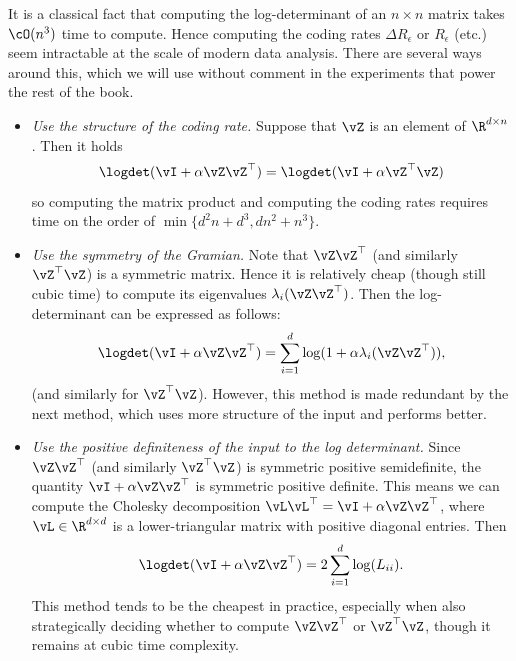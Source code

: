 \documentclass[../../book-main.tex]{subfiles}
\begin{document}
\begin{remark}
    It is a classical fact that computing the log-determinant of an
    \(n \times n\) matrix takes \(\cO(n^{3})\) time to compute. Hence
    computing the coding rates \(\Delta R_{\epsilon}\) or
    \(R_{\epsilon}\) (etc.) seem intractable at the scale of modern
    data analysis. There are several ways around this, which we will
    use without comment in the experiments that power the rest of the book.
    \begin{itemize}
        \item \textit{Use the structure of the coding rate.} Suppose
            that \(\vZ\) is an element of \(\R^{d \times n}\). Then it holds
            \begin{equation}
                \logdet(\vI + \alpha \vZ\vZ^{\top}) = \logdet(\vI +
                \alpha \vZ^{\top}\vZ)
            \end{equation}
            so computing the matrix product and computing the coding
            rates requires time on the order of \(\min\{d^{2}n +
            d^{3}, dn^{2} + n^{3}\}\).
        \item \textit{Use the symmetry of the Gramian.}
            Note that \(\vZ\vZ^{\top}\) (and similarly
            \(\vZ^{\top}\vZ\)) is a symmetric matrix. Hence it is
            relatively cheap (though still cubic time) to compute its
            eigenvalues \(\lambda_{i}(\vZ\vZ^{\top})\). Then the
            log-determinant can be expressed as follows:
            \begin{equation}
                \logdet(\vI + \alpha \vZ\vZ^{\top}) = \sum_{i =
                1}^{d}\log(1 + \alpha \lambda_{i}(\vZ\vZ^{\top})),
            \end{equation}
            (and similarly for \(\vZ^{\top}\vZ\)). However, this
            method is made redundant by the next method, which uses
            more structure of the input and performs better.
        \item \textit{Use the positive definiteness of the input to the log
            determinant.} Since \(\vZ\vZ^{\top}\) (and similarly
            \(\vZ^{\top}\vZ\)) is symmetric positive semidefinite,
            the quantity \(\vI + \alpha \vZ\vZ^{\top}\) is symmetric
            positive definite. This means we can compute the Cholesky
            decomposition \(\vL\vL^{\top} = \vI + \alpha
            \vZ\vZ^{\top}\), where \(\vL \in \R^{d \times d}\) is a
            lower-triangular matrix with positive diagonal entries. Then
            \begin{equation}
                \logdet(\vI + \alpha \vZ\vZ^{\top}) = 2\sum_{i =
                1}^{d}\log(L_{ii}).
            \end{equation}
            This method tends to be the cheapest in practice,
            especially when also strategically deciding whether to
            compute \(\vZ\vZ^{\top}\) or \(\vZ^{\top}\vZ\), though it
            remains at cubic time complexity.
    \end{itemize}
\end{remark}
\end{document}
